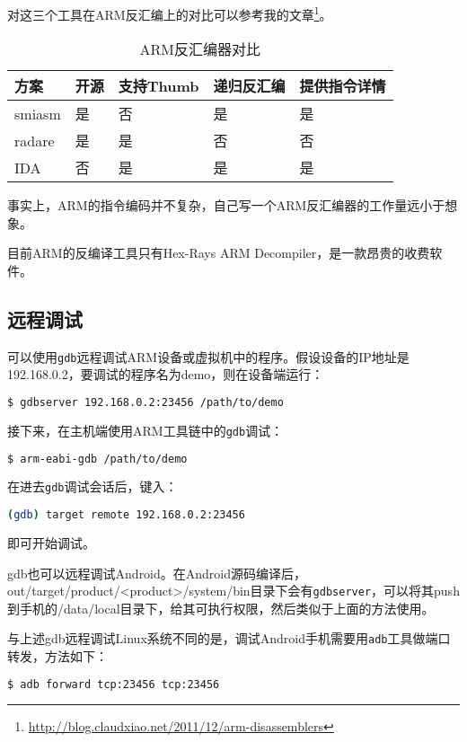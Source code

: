 对这三个工具在ARM反汇编上的对比可以参考我的文章\footnote{\url{http://blog.claudxiao.net/2011/12/arm-disassemblers}}。

\begin{table}[htbp]
  \caption{ARM反汇编器对比}
  \centering
  \begin{tabular}{lllll}
    \toprule
    方案 & 开源 & 支持Thumb & 递归反汇编 & 提供指令详情 \\
    \midrule
    smiasm & 是 & 否 & 是 & 是 \\
    radare & 是 & 是 & 否 & 否 \\
    IDA & 否 & 是 & 是 & 是\\
    \bottomrule
  \end{tabular}
\end{table}

事实上，ARM的指令编码并不复杂，自己写一个ARM反汇编器的工作量远小于想象。

目前ARM的反编译工具只有Hex-Rays ARM Decompiler，是一款昂贵的收费软件。
\subsection{远程调试}
可以使用\lstinline!gdb!远程调试ARM设备或虚拟机中的程序。假设设备的IP地址是192.168.0.2，要调试的程序名为demo，则在设备端运行：
\begin{lstlisting}[language=bash, numbers=none]
  $ gdbserver 192.168.0.2:23456 /path/to/demo
\end{lstlisting}

接下来，在主机端使用ARM工具链中的\lstinline!gdb!调试：
\begin{lstlisting}[language=bash, numbers=none]
  $ arm-eabi-gdb /path/to/demo
\end{lstlisting}

在进去\lstinline!gdb!调试会话后，键入：
\begin{lstlisting}[language=bash, numbers=none]
  (gdb) target remote 192.168.0.2:23456
\end{lstlisting}

即可开始调试。

gdb也可以远程调试Android。在Android源码编译后，out/target/product/<product>/system/bin目录下会有\lstinline!gdbserver!，可以将其push到手机的/data/local目录下，给其可执行权限，然后类似于上面的方法使用。

与上述gdb远程调试Linux系统不同的是，调试Android手机需要用\lstinline!adb!工具做端口转发，方法如下：

\begin{lstlisting}[language=bash, numbers=none]
  $ adb forward tcp:23456 tcp:23456
\end{lstlisting}

